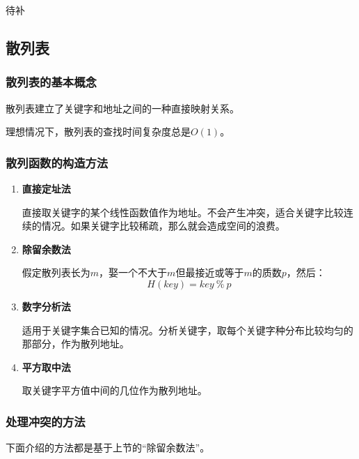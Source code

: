 \documentclass[12pt, a4paper, oneside]{ctexart}
\begin{document}
待补

\subsection{散列表}

\subsubsection{散列表的基本概念}

散列表建立了关键字和地址之间的一种直接映射关系。

理想情况下，散列表的查找时间复杂度总是$O(1)$。

\subsubsection{散列函数的构造方法}

\begin{enumerate}
  \item {\bf 直接定址法}
  
  直接取关键字的某个线性函数值作为地址。不会产生冲突，适合关键字比较连续的情况。如果关键字比较稀疏，那么就会造成空间的浪费。

  \item {\bf 除留余数法}
  
  假定散列表长为$m$，娶一个不大于$m$但最接近或等于$m$的质数$p$，然后：
  \begin{equation*}
    H(key)=key\ \%\ p
  \end{equation*}

  \item {\bf 数字分析法}
  
  适用于关键字集合已知的情况。分析关键字，取每个关键字种分布比较均匀的那部分，作为散列地址。

  \item {\bf 平方取中法}
  
  取关键字平方值中间的几位作为散列地址。

\end{enumerate}

\subsubsection{处理冲突的方法}

下面介绍的方法都是基于上节的“除留余数法”。
\end{document}
